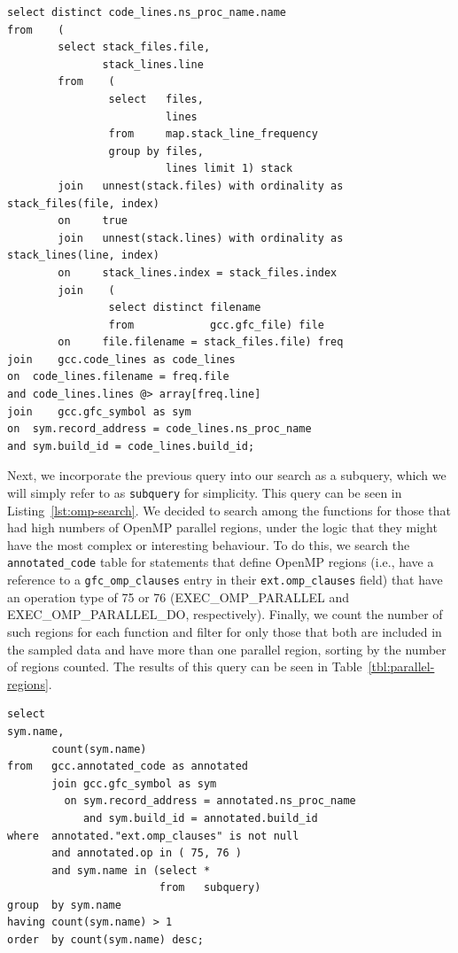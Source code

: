\begin{lstlisting}[caption=Determing Functions Sampled, label=lst:restrict]
select distinct code_lines.ns_proc_name.name
from	(
		select stack_files.file,
		       stack_lines.line
		from	(
				select   files,
				         lines
				from     map.stack_line_frequency
				group by files,
				         lines limit 1) stack
		join   unnest(stack.files) with ordinality as stack_files(file, index)
		on     true
		join   unnest(stack.lines) with ordinality as stack_lines(line, index)
		on     stack_lines.index = stack_files.index
		join	(
				select distinct filename
				from            gcc.gfc_file) file
		on     file.filename = stack_files.file) freq
join	gcc.code_lines as code_lines
on	code_lines.filename = freq.file
and	code_lines.lines @> array[freq.line]
join	gcc.gfc_symbol as sym
on	sym.record_address = code_lines.ns_proc_name
and	sym.build_id = code_lines.build_id;
\end{lstlisting}

Next, we incorporate the previous query into our search as a subquery, which we will simply refer to 
as \texttt{subquery} for simplicity.
This query can be seen in Listing~\ref{lst:omp-search}.
We decided to search among the functions for those that had high numbers of OpenMP parallel regions, under 
the logic that they might have the most complex or interesting behaviour.
To do this, we search the \texttt{annotated\_code} table for statements that define OpenMP regions 
(i.e., have a reference to a \texttt{gfc\_omp\_clauses} entry in their \texttt{ext.omp\_clauses} field) 
that have an operation type of 75 or 76 (EXEC\_OMP\_PARALLEL and 
EXEC\_OMP\_PARALLEL\_DO, respectively).
Finally, we count the number of such regions for each function and filter for only those that both are 
included in the sampled data and have more than one parallel region, sorting by the number of 
regions counted.
The results of this query can be seen in Table~\ref{tbl:parallel-regions}.

\begin{lstlisting}[caption=Finding High Concentrations of OpenMP Parallel Regions, 
label=lst:omp-search]
select 
sym.name,
       count(sym.name)
from   gcc.annotated_code as annotated
       join gcc.gfc_symbol as sym
         on sym.record_address = annotated.ns_proc_name
            and sym.build_id = annotated.build_id
where  annotated."ext.omp_clauses" is not null
       and annotated.op in ( 75, 76 )
       and sym.name in (select *
                        from   subquery)
group  by sym.name
having count(sym.name) > 1
order  by count(sym.name) desc;  
\end{lstlisting}

